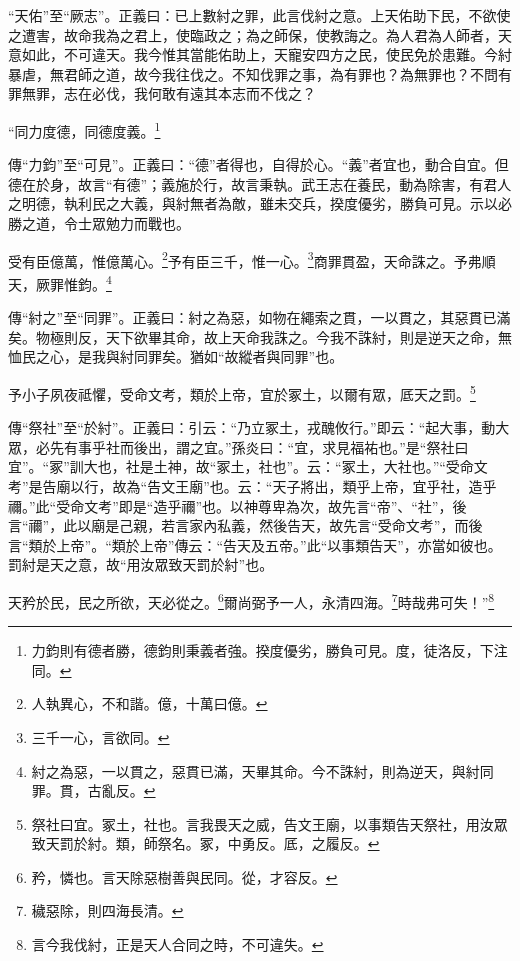 {\noindent\shu{}\fzkt “天佑”至“厥志”。正義曰：已上數紂之罪，此言伐紂之意。上天佑助下民，不欲使之遭害，故命我為之君上，使臨政之；為之師保，使教誨之。為人君為人師者，天意如此，不可違天。我今惟其當能佑助上，天寵安四方之民，使民免於患難。今紂暴虐，無君師之道，故今我往伐之。不知伐罪之事，為有罪也？為無罪也？不問有罪無罪，志在必伐，我何敢有遠其本志而不伐之？ \par}

“同力度德，同德度義。\footnote{力鈞則有德者勝，德鈞則秉義者強。揆度優劣，勝負可見。度，徒洛反，下注同。}

{\noindent\zhuan{}\fzbyks 傳“力鈞”至“可見”。正義曰：“德”者得也，自得於心。“義”者宜也，動合自宜。但德在於身，故言“有德”；義施於行，故言秉執。武王志在養民，動為除害，有君人之明德，執利民之大義，與紂無者為敵，雖未交兵，揆度優劣，勝負可見。示以必勝之道，令士眾勉力而戰也。 \par}

受有臣億萬，惟億萬心。\footnote{人執異心，不和諧。億，十萬曰億。}予有臣三千，惟一心。\footnote{三千一心，言欲同。}商罪貫盈，天命誅之。予弗順天，厥罪惟鈞。\footnote{紂之為惡，一以貫之，惡貫已滿，天畢其命。今不誅紂，則為逆天，與紂同罪。貫，古亂反。}

{\noindent\zhuan{}\fzbyks 傳“紂之”至“同罪”。正義曰：紂之為惡，如物在繩索之貫，一以貫之，其惡貫已滿矣。物極則反，天下欲畢其命，故上天命我誅之。今我不誅紂，則是逆天之命，無恤民之心，是我與紂同罪矣。猶如“故縱者與同罪”也。 \par}

予小子夙夜祗懼，受命文考，類於上帝，宜於冢土，以爾有眾，厎天之罰。\footnote{祭社曰宜。冢土，社也。言我畏天之威，告文王廟，以事類告天祭社，用汝眾致天罰於紂。類，師祭名。冢，中勇反。厎，之履反。}

{\noindent\zhuan{}\fzbyks 傳“祭社”至“於紂”。正義曰：引云：“乃立冢土，戎醜攸行。”即云：“起大事，動大眾，必先有事乎社而後出，謂之宜。”孫炎曰：“宜，求見福祐也。”是“祭社曰宜”。“冢”訓大也，社是土神，故“冢土，社也”。云：“冢土，大社也。”“受命文考”是告廟以行，故為“告文王廟”也。云：“天子將出，類乎上帝，宜乎社，造乎禰。”此“受命文考”即是“造乎禰”也。以神尊卑為次，故先言“帝”、“社”，後言“禰”，此以廟是己親，若言家內私義，然後告天，故先言“受命文考”，而後言“類於上帝”。“類於上帝”傳云：“告天及五帝。”此“以事類告天”，亦當如彼也。罰紂是天之意，故“用汝眾致天罰於紂”也。 \par}

天矜於民，民之所欲，天必從之。\footnote{矜，憐也。言天除惡樹善與民同。從，才容反。}爾尚弼予一人，永清四海。\footnote{穢惡除，則四海長清。}時哉弗可失！”\footnote{言今我伐紂，正是天人合同之時，不可違失。}

